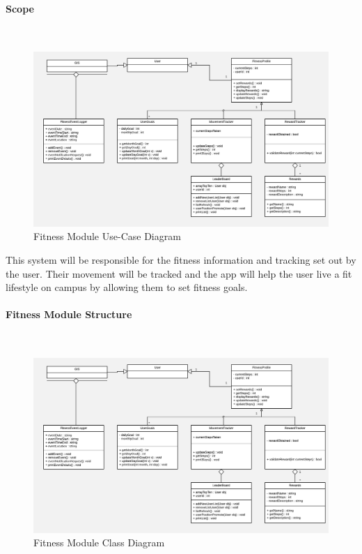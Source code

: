 \documentclass{article}
\begin{document}
			\paragraph{Scope}\mbox{} \\
				\begin{figure}[h]
					\includegraphics[width=\textwidth]{./Images/Fitness_System_Class_Diagram_-_Fixed_Dependencies.png} 
					\caption{Fitness Module Use-Case Diagram}
				\end{figure}
				
			{This system will be responsible for the fitness information and tracking set out by the user. Their movement will be tracked and the app will help the user live a fit lifestyle on campus by allowing them to set fitness goals.}
			
			\paragraph{Fitness Module Structure} \mbox{} \\
			\begin{figure}[h]
				\includegraphics[width=\textwidth]{./Images/Fitness_System_Class_Diagram_-_Fixed_Dependencies.png} 
				\caption{Fitness Module Class Diagram}
			\end{figure}
			
\end{document}
